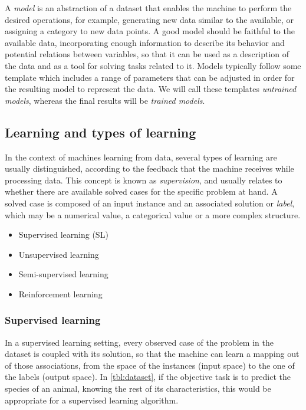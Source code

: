 
A \textit{model} is an abstraction of a dataset that enables the machine to perform the desired operations, for example, generating new data similar to the available, or assigning a category to new data points. A good model should be faithful to the available data, incorporating enough information to describe its behavior and potential relations between variables, so that it can be used as a description of the data and as a tool for solving tasks related to it. Models typically follow some template which includes a range of parameters that can be adjusted in order for the resulting model to represent the data. We will call these templates \textit{untrained models}, whereas the final results will be \textit{trained models}.

\subsection{Learning and types of learning}

In the context of machines learning from data, several types of learning are usually distinguished, according to the feedback that the machine receives while processing data. This concept is known as \textit{supervision}, and usually relates to whether there are available solved cases for the specific problem at hand. A solved case is composed of an input instance and an associated solution or \textit{label}, which may be a numerical value, a categorical value or a more complex structure.
 
\begin{itemize}
    \item Supervised learning (SL)
    \item Unsupervised learning
    \item Semi-supervised learning
    \item Reinforcement learning
\end{itemize}

\subsubsection{Supervised learning}

In a supervised learning setting, every observed case of the problem in the dataset is coupled with its solution, so that the machine can learn a mapping out of those associations, from the space of the instances (input space) to the one of the labels (output space). In \autoref{tbl:dataset}, if the objective task is to predict the species of an animal, knowing the rest of its characteristics, this would be appropriate for a supervised learning algorithm. 

